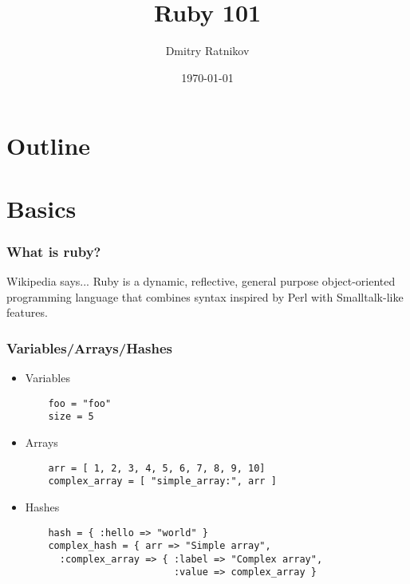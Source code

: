 \documentclass{beamer}
\title{Ruby 101}
\author{Dmitry Ratnikov}
\date{\today}
\begin{document}
\frame{\titlepage}

\section[]{Outline}
\frame{\tableofcontents}

\section{Basics}

\begin{frame}
  \frametitle{What is ruby?}
  \begin{block}{Wikipedia says...}
    Ruby is a \alert<2,3>{dynamic}, \alert<2,4>{reflective}, general purpose \alert<2,5>{object-oriented} programming language that combines syntax 
    inspired by \alert<6>{Perl} with \alert<6>{Smalltalk}-like features. 
  \end{block}
\end{frame}
  
\begin{frame}[fragile]
  \frametitle{Variables/Arrays/Hashes}
  \begin{itemize}
    \item<1->{Variables}
      \begin{verbatim}
	foo = "foo"
	size = 5
      \end{verbatim}
    \item<2->{Arrays}
      \begin{verbatim}
	arr = [ 1, 2, 3, 4, 5, 6, 7, 8, 9, 10]
	complex_array = [ "simple_array:", arr ]
      \end{verbatim}
    \item<3->{Hashes}
      \begin{verbatim}
	hash = { :hello => "world" }
	complex_hash = { arr => "Simple array", 
	  :complex_array => { :label => "Complex array", 
	                      :value => complex_array }
      \end{verbatim}
  \end{itemize}
\end{frame}
\end{document}
